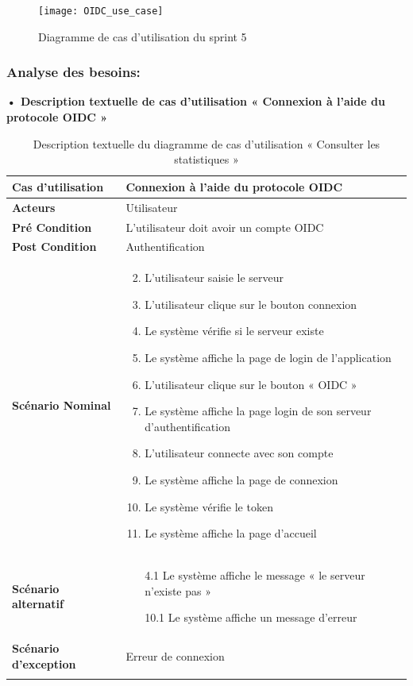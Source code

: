 \begin{figure}[H]
  \centering
  \texttt{[image: OIDC\_use\_case]}
  \caption{Diagramme de cas d'utilisation du sprint 5}
  \label{fig:UseCaseDiagramSp51}
\end{figure}

\subsubsection{Analyse des besoins:}
\textbf{•	Description textuelle de cas d'utilisation « Connexion à l'aide du protocole OIDC  »}

\begin{longtable}{|p{5cm}|p{10cm}|}
\hline
\textbf{Cas d'utilisation}&Connexion à l'aide du protocole OIDC\\
\hline
\textbf{Acteurs}&Utilisateur\\
\hline
\textbf{Pré Condition}&L'utilisateur doit avoir un compte OIDC\\
\hline
\textbf{Post Condition}&Authentification\\
\hline
\textbf{Scénario Nominal}&
\vspace{-\baselineskip}
\begin{enumerate}
  \setcounter{enumi}{1}
    \item L'utilisateur saisie le serveur
    \item L'utilisateur clique sur le bouton connexion
    \item Le système vérifie si le serveur existe
    \item Le système affiche la page de login de l'application
    \item L'utilisateur clique sur le bouton « OIDC »
    \item Le système affiche la page login de son serveur d'authentification
    \item L'utilisateur connecte avec son compte
    \item Le système affiche la page de connexion 
    \item Le système vérifie le token
    \item Le système affiche la page d'accueil 
  
\end{enumerate}\\
\hline
\textbf{Scénario alternatif}&
\vspace{-\baselineskip}
\begin{enumerate}
  \item [4.1] Le système affiche le message « le serveur n'existe pas »
  \item [10.1] Le système affiche un message d'erreur
\end{enumerate}\\
\hline
\textbf{Scénario d'exception}&Erreur de connexion\\
\hline
\caption{Description textuelle du diagramme de cas d'utilisation « Consulter les statistiques »}
\label{tab:use_case_oidc_connect}
\end{longtable}

